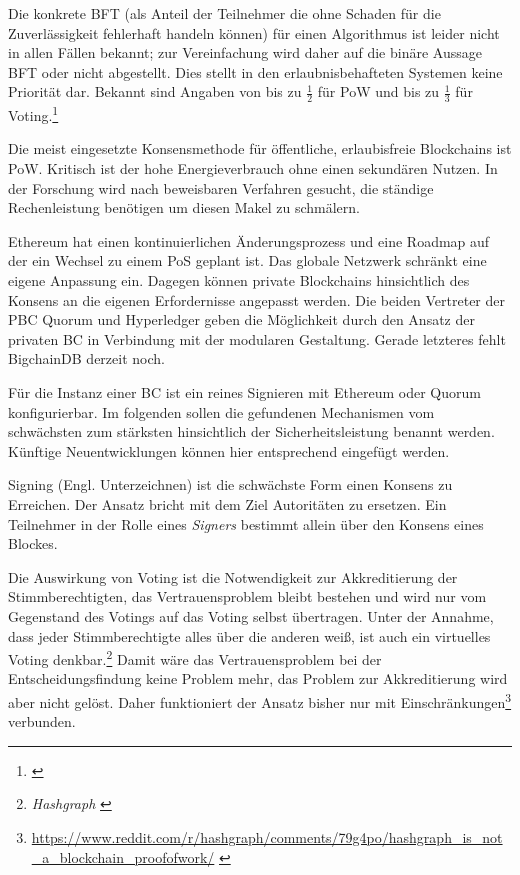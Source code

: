 Die konkrete \gls{BFT} (als Anteil der Teilnehmer die ohne Schaden für die Zuverlässigkeit fehlerhaft handeln können) für einen Algorithmus ist leider nicht in allen Fällen bekannt; zur Vereinfachung wird daher auf die binäre Aussage \gls{BFT} oder nicht abgestellt.
Dies stellt in den erlaubnisbehafteten Systemen keine Priorität dar.
Bekannt sind Angaben von bis zu \(\frac{1}{2}\) für \gls{PoW} und bis zu \(\frac{1}{3}\) für Voting.\footnote{\cite{p:hyperledger:consensus}}

Die meist eingesetzte Konsensmethode für öffentliche, erlaubisfreie Blockchains ist \gls{PoW}. 
Kritisch ist der hohe Energieverbrauch ohne einen sekundären Nutzen.
In der Forschung wird nach beweisbaren Verfahren gesucht, die ständige Rechenleistung benötigen um diesen Makel zu schmälern.

Ethereum hat einen kontinuierlichen Änderungsprozess und eine Roadmap auf der ein Wechsel zu einem \gls{PoS} geplant ist.
Das globale Netzwerk schränkt eine eigene Anpassung ein.
Dagegen können private Blockchains hinsichtlich des Konsens an die eigenen Erfordernisse angepasst werden. 
Die beiden Vertreter der \gls{PBC} Quorum und Hyperledger geben die Möglichkeit durch den Ansatz der privaten \gls{BC} in Verbindung mit der modularen Gestaltung.
Gerade letzteres fehlt BigchainDB derzeit noch.

Für die Instanz einer \gls{BC} ist ein reines Signieren \zB{} mit Ethereum oder Quorum konfigurierbar.
Im folgenden sollen die gefundenen Mechanismen vom schwächsten zum stärksten hinsichtlich der Sicherheitsleistung benannt werden.
Künftige Neuentwicklungen können hier entsprechend eingefügt werden.

Signing (Engl. Unterzeichnen) ist die schwächste Form einen Konsens zu Erreichen.
Der Ansatz bricht mit dem Ziel Autoritäten zu ersetzen.
Ein Teilnehmer in der Rolle eines \emph{Signers} bestimmt allein über den Konsens eines Blockes.

Die Auswirkung von Voting ist die Notwendigkeit zur Akkreditierung der Stimmberechtigten, das Vertrauensproblem bleibt bestehen und wird nur vom Gegenstand des Votings auf das Voting selbst übertragen.
Unter der Annahme, dass jeder Stimmberechtigte alles über die anderen weiß, ist auch ein virtuelles Voting denkbar.\footnote{\emph{Hashgraph} \autocite{p:hashgraph}}
Damit wäre das Vertrauensproblem bei der Entscheidungsfindung keine Problem mehr, das Problem zur Akkreditierung wird aber nicht gelöst.
Daher funktioniert der Ansatz bisher nur mit Einschränkungen\footnote{\url{https://www.reddit.com/r/hashgraph/comments/79g4po/hashgraph_is_not_a_blockchain_proofofwork/}  \autocite{w:reddit}} verbunden.

